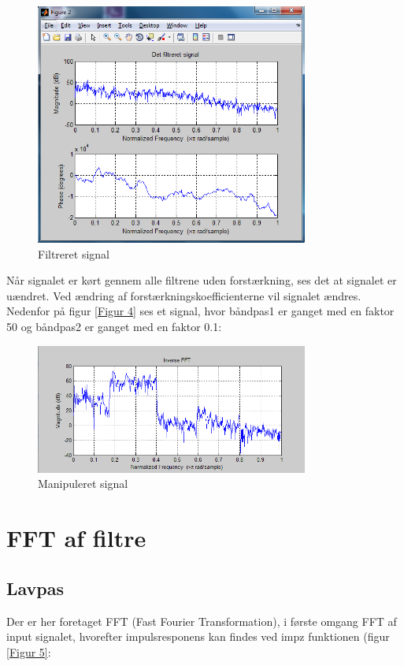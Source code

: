 \begin{figure}[H]
	\centering
	\includegraphics[width=0.8\textwidth]{Figurer/2_Filtreret_signal}
	\caption{Filtreret signal}
	\label{figur 3}
\end{figure}
Når signalet er kørt gennem alle filtrene uden forstærkning, ses det at signalet er uændret. Ved ændring af forstærkningskoefficienterne vil signalet ændres. Nedenfor på figur \ref{Figur 4} ses et signal, hvor båndpas1 er ganget med en faktor 50 og båndpas2 er ganget med en faktor 0.1:

\begin{figure}[h]
	\centering
	\includegraphics[width=0.8\textwidth]{Figurer/Forstaerkning_og_Daempning}
	\caption{Manipuleret signal}
	\label{figur 4}
\end{figure}

\section{FFT af filtre}
\subsection{Lavpas}
Der er her foretaget FFT (Fast Fourier Transformation), i første omgang FFT af input signalet, hvorefter impulsresponens kan findes ved impz funktionen (figur \ref{Figur 5}:

